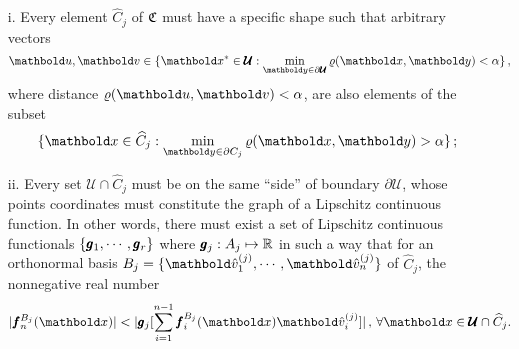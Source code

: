 \begin{itemize}
	\setlength\itemsep{.1em}
	\item[i.] Every element $\widehat{C}_j$ of $\mathfrak{C}$ must have a specific shape such that arbitrary vectors 
\begin{equation*}
\vto{u},\vto{v}\in\{\vto{x}^*\in\pmb{\mathcal{U}}:\min_{\vto{y}\in \partial\pmb{\mathcal{U}}}\fua{\varrho}{\vto{x},\vto{y}}<\alpha\}\,,
\end{equation*}
where distance $\fua{\varrho}{\vto{u},\vto{v}}<\alpha$, are also elements of the subset	
\begin{equation*}
\{\vto{x}\in\widehat{C}_j:\min_{\vto{y}\in \partial C_j}\fua{\varrho}{\vto{x},\vto{y}}>\alpha\}\,;
\end{equation*}

	\item[ii.] Every set $\pmb{\mathcal{U}}\cap \widehat{C}_j$ must be on the same ``side'' of boundary $\partial\pmb{\mathcal{U}}$, whose points coordinates must constitute the graph of a Lipschitz continuous function. In other words, there must exist a set of Lipschitz continuous functionals $\{\pmb{g}_1,\cdots,\pmb{g}_r\}$ where $\pmb{g}_j : A_j \mapsto \mathbb{R}$ in such a way that for an orthonormal basis $B_j=\{\vun{v}_1^{(j)},\cdots,\vun{v}_n^{(j)}\}$ of $\widehat{C}_j$, the nonnegative real number
\begin{equation*}
|\fua{\vtf{f}_n^{B_j}}{\vto{x}}|<|\vtf{g}_j[\sum_{i=1}^{n-1}\fua{\vtf{f}_i^{B_j}}{\vto{x}}\vun{v}_i^{(j)}]|\,,\,\forall \vto{x}\in \pmb{\mathcal{U}}\cap\widehat{C}_j.
\end{equation*}	
\end{itemize}

